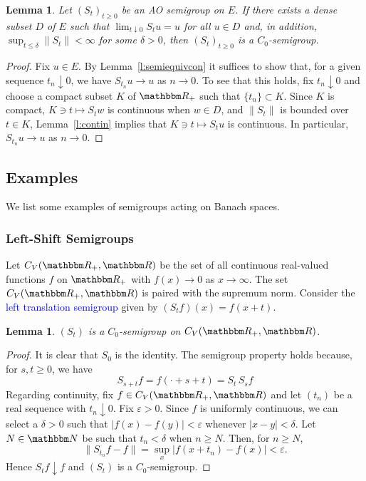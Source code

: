 \documentclass[12pt, reqno]{amsart}
\renewcommand{\leq}{\leqslant}
\renewcommand{\geq}{\geqslant}
\newcommand{\1}{\mathbbm 1}
\newcommand{\RR}{\mathbbm R}
\newcommand{\NN}{\mathbbm N}
\renewcommand{\epsilon}{\varepsilon}
\theoremstyle{plain}
\newtheorem{lemma}[theorem]{Lemma}
\theoremstyle{definition}
\newcommand{\navy}[1]{\textcolor{blue}{#1}}
\begin{document}
\begin{lemma}\label{l:aose}
    Let $(S_t)_{t \geq 0}$ be an AO semigroup on $E$.
    If there exists a dense subset $D$ of $E$ such that $\lim_{t \downarrow 0}
    S_t u = u$ for all $u \in D$ and, in addition, $\sup_{t \leq \delta} \|S_t
    \| < \infty$ for some $\delta > 0$, then $(S_t)_{t \geq 0}$ is a
    $C_0$-semigroup.
\end{lemma}

\begin{proof}
    Fix $u \in E$.  By Lemma~\ref{l:semiequivcon} it suffices to show
    that, for a given sequence $t_n \downarrow 0$, we have $S_{t_n} u \to u$ as
    $n \to 0$. 
    To see that this holds, fix $t_n \downarrow 0$ and choose a compact subset
    $K$ of $\RR_+$ such
    that $\{t_n\} \subset K$.  Since $K$ is compact, $K \ni t \mapsto S_t w$ is
    continuous when $w \in D$, and $\|S_t \|$ is bounded over $t \in K$,
    Lemma~\ref{l:contin} implies that $K \ni t \mapsto S_t u$ is continuous.
    In particular, $S_{t_n} u \to u$ as $n \to 0$. 
\end{proof}



\subsection{Examples}

We list some examples of semigroups acting on Banach spaces.


\subsubsection{Left-Shift Semigroups}

Let $C_V(\RR_+, \RR)$ be the set of all continuous real-valued functions $f$ on
$\RR_+$ with $f(x) \to 0$ as $x \to \infty$.  The set $C_V(\RR_+, \RR)$ is paired
with the supremum norm.  Consider the \navy{left
translation semigroup} given by $(S_t f)(x) = f(x + t)$.

\begin{lemma}\label{l:ltsemi}
    $(S_t)$ is a $C_0$-semigroup on $C_V(\RR_+, \RR)$.  
\end{lemma}

\begin{proof}
    It is clear that $S_0$ is the identity.  The semigroup property holds
    because, for $s, t \geq 0$, we have
    \begin{equation*}
        S_{s + t} f = f(\cdot + s + t) = S_t \, S_s f
    \end{equation*}
    Regarding continuity, fix $f \in C_V(\RR_+, \RR)$ and let $(t_n)$ be a real sequence
    with $t_n \downarrow 0$.  Fix $\epsilon > 0$.  Since $f$ is uniformly
    continuous, we can select a $\delta > 0$ such that $|f(x) - f(y)| < \epsilon$
    whenever $|x-y|<\delta$.  Let $N \in \NN$ be such that $t_n < \delta$ when
    $n \geq N$.  Then, for $n \geq N$,
    \begin{equation*}
        \| S_{t_n} f - f \|
        = \sup_x | f(x + t_n)  - f(x) |
        < \epsilon.
    \end{equation*}
    Hence $S_t f \downarrow f$ and $(S_t)$ is a $C_0$-semigroup.
\end{proof}
\end{document}
